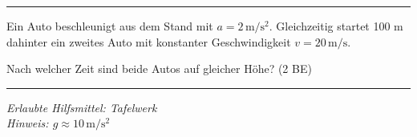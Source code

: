 \documentclass[11pt,a4paper]{article}
\newcounter{aufgabe}
\begin{document}
\vspace{0.5cm}
\hrule
\vspace{0.3cm}

\noindent{}

\vspace{0.3cm}

Ein Auto beschleunigt aus dem Stand mit $a = 2\,\mathrm{m/s^2}$. Gleichzeitig startet 100 m dahinter ein zweites Auto mit konstanter Geschwindigkeit $v = 20\,\mathrm{m/s}$.

Nach welcher Zeit sind beide Autos auf gleicher Höhe? \hfill (2 BE)

\vspace{3cm}

\hrule
\vspace{0.3cm}
\begin{center}
\textit{Erlaubte Hilfsmittel: Tafelwerk}\\[0.2cm]
\textit{Hinweis: $g \approx 10\,\mathrm{m/s^2}$}
\end{center}
\end{document}
